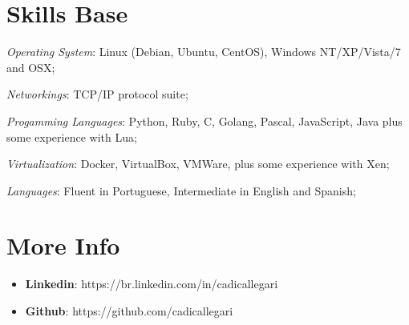 \documentclass[margin]{res}
\begin{document}
\begin{resume}
\section{Skills Base}  \textit{Operating System}:  Linux (Debian, Ubuntu, CentOS), Windows NT/XP/Vista/7 and OSX;

      \textit{Networkings}: TCP/IP protocol suite;
  
      \textit{Progamming Languages}: Python, Ruby, C, Golang, Pascal, JavaScript, Java plus some experience with Lua;
  
      \textit{Virtualization}: Docker, VirtualBox, VMWare, plus some experience with Xen;

      \textit{Languages}: Fluent in Portuguese, Intermediate in English and Spanish;
 
\section{More Info}
    \begin{itemize}
        \item \textbf{Linkedin}: https://br.linkedin.com/in/cadicallegari
         \item \textbf{Github}: https://github.com/cadicallegari
    \end{itemize}


\end{resume} 
\end{document}
